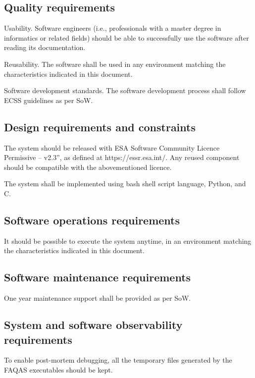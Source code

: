 \subsection{Quality requirements}

\RQ{} Usability. Software engineers (i.e., professionals with a master degree in informatics or related fields) should be able to successfully use the software after reading its documentation.

\RQ{} Reusability. The software shall be used in any environment matching the characteristics indicated in this document.

\RQ{} Software development standards. The software development process shall follow ECSS guidelines as per SoW.

\subsection{Design requirements and constraints}

\RQ{} The system should be released with ESA Software Community Licence Permissive – v2.3”, as defined at https://essr.esa.int/. Any reused component should be compatible with the abovementioned licence.

\RQ{} The system shall be implemented using bash shell script language, Python, and C.

\subsection{Software operations requirements}

\RQ{} It should be possible to execute the system anytime, in an environment matching the characteristics indicated in this document.

\subsection{Software maintenance requirements}

\RQ{} One year maintenance support shall be provided as per SoW.


\subsection{System and software observability requirements}

\RQ{} To enable post-mortem debugging, all the temporary files generated by the FAQAS executables should be kept.

